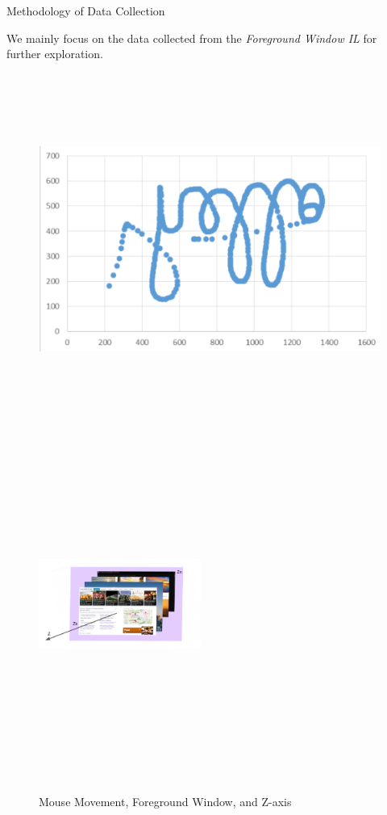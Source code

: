 \documentclass[final]{beamer}
\newlength{\colwidth}
\begin{document}
\begin{frame}[t]
\begin{columns}[t]
\begin{column}{\colwidth}
\begin{alertblock}{Methodology of Data Collection}
\begin{itemize}
    \end{itemize}

    We mainly focus on the data collected from the \textit{Foreground Window IL} for further exploration.
    \begin{figure}
      \includegraphics[width=0.475 \textwidth, height=11.5cm]{mouse_movement.png}
        \hspace{\fill}
        \includegraphics[width=0.475\textwidth, height=11.5cm]{foreground_desktopMapper.PNG}
      \caption{Mouse Movement, Foreground Window, and Z-axis}\label{fig:xyz}
    \end{figure}
  \end{alertblock}


\end{column}
\end{columns}
\end{frame}
\end{document}
